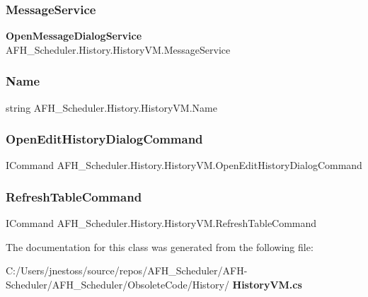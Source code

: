 \subsubsection{MessageService}
{\footnotesize\ttfamily \textbf{ Open\+Message\+Dialog\+Service} A\+F\+H\+\_\+\+Scheduler.\+History.\+History\+V\+M.\+Message\+Service\hspace{0.3cm}{\ttfamily [get]}}

\mbox{\label{class_a_f_h___scheduler_1_1_history_1_1_history_v_m_a4959f6a48b98467d15f5a41835e3c7a4}} 
\subsubsection{Name}
{\footnotesize\ttfamily string A\+F\+H\+\_\+\+Scheduler.\+History.\+History\+V\+M.\+Name\hspace{0.3cm}{\ttfamily [get]}}

\mbox{\label{class_a_f_h___scheduler_1_1_history_1_1_history_v_m_a9c89be7cb9f0ef739c40721ef0e9d3cf}} 
\subsubsection{OpenEditHistoryDialogCommand}
{\footnotesize\ttfamily I\+Command A\+F\+H\+\_\+\+Scheduler.\+History.\+History\+V\+M.\+Open\+Edit\+History\+Dialog\+Command\hspace{0.3cm}{\ttfamily [get]}}

\mbox{\label{class_a_f_h___scheduler_1_1_history_1_1_history_v_m_ab89a9ebdd65b08acf8784ca5e3a7e966}} 
\subsubsection{RefreshTableCommand}
{\footnotesize\ttfamily I\+Command A\+F\+H\+\_\+\+Scheduler.\+History.\+History\+V\+M.\+Refresh\+Table\+Command\hspace{0.3cm}{\ttfamily [get]}}



The documentation for this class was generated from the following file\+:\begin{DoxyCompactItemize}
\item 
C\+:/\+Users/jnestoss/source/repos/\+A\+F\+H\+\_\+\+Scheduler/\+A\+F\+H-\/\+Scheduler/\+A\+F\+H\+\_\+\+Scheduler/\+Obsolete\+Code/\+History/\textbf{ History\+V\+M.\+cs}\end{DoxyCompactItemize}
